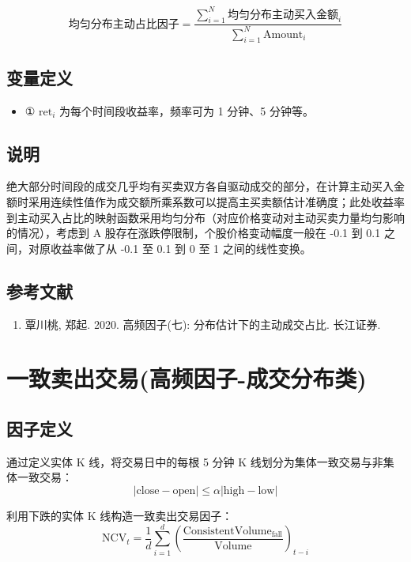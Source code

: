 \documentclass{article}
\begin{document}
\begin{equation}
    \text{均匀分布主动占比因子} = \frac{\sum_{i=1}^{N} \text{均匀分布主动买入金额}_i}{\sum_{i=1}^{N} \mathrm{Amount}_i}
\end{equation}

\subsection{变量定义}
\begin{itemize}
    \item ① \( \mathrm{ret}_i \) 为每个时间段收益率，频率可为 1 分钟、5 分钟等。
\end{itemize}

\subsection{说明}
绝大部分时间段的成交几乎均有买卖双方各自驱动成交的部分，在计算主动买入金额时采用连续性值作为成交额所乘系数可以提高主买卖额估计准确度；此处收益率到主动买入占比的映射函数采用均匀分布（对应价格变动对主动买卖力量均匀影响的情况），考虑到 A 股存在涨跌停限制，个股价格变动幅度一般在 -0.1 到 0.1 之间，对原收益率做了从 -0.1 至 0.1 到 0 至 1 之间的线性变换。

\subsection{参考文献}
\begin{enumerate}
    \item 覃川桃, 郑起. 2020. 高频因子(七): 分布估计下的主动成交占比. 长江证券.
\end{enumerate}

\section{一致卖出交易(高频因子-成交分布类)}

\subsection{因子定义}

通过定义实体 K 线，将交易日中的每根 5 分钟 K 线划分为集体一致交易与非集体一致交易：
\begin{equation}
    |\mathrm{close} - \mathrm{open}| \leq \alpha |\mathrm{high} - \mathrm{low}|
\end{equation}

利用下跌的实体 K 线构造一致卖出交易因子：
\begin{equation}
    \mathrm{NCV}_t = \frac{1}{d} \sum_{i=1}^{d} \left( \frac{\mathrm{ConsistentVolume}_{\mathrm{fall}}}{\mathrm{Volume}} \right)_{t-i}
\end{equation}
\end{document}

